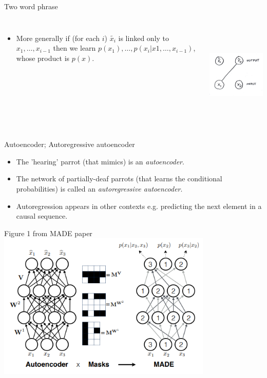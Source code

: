 \documentclass[usenames,dvipsnames]{beamer}
\begin{document}
\begin{frame}{Two word phrase}
	\begin{columns}
    \begin{itemize}
    \item{More generally if (for each $i$) $\tilde{x_i}$ is linked only to $x_1, \dots, x_{i-1}$ then we learn $p(x_1), \dots, p(x_i | x1, \dots, x_{i-1})$, whose product is $p(x)$.}
    \end{itemize}
             \centering
             \includegraphics[height=5cm]{image_03}
         \end{columns} 
\end{frame}

\begin{frame}{Autoencoder; Autoregressive autoencoder}
    \begin{itemize}
      \item{The 'hearing' parrot (that mimics) is an \textit{autoencoder}.}
	\item{The network of partially-deaf parrots (that learns the conditional probabilities) is called an \textit{autoregressive autoencoder}.}
	\item{Autoregression appears in other contexts e.g. predicting the next element in a causal sequence.}
    \end{itemize}
\end{frame}

\begin{frame}{Figure 1 from MADE paper}
     \centering
     \includegraphics[height=7cm]{image_04}
\end{frame}
\end{document}
